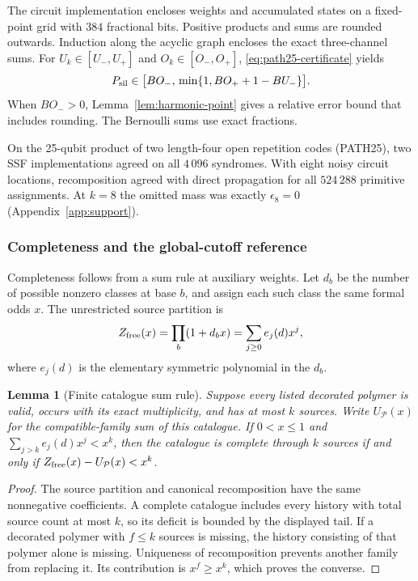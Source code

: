 \documentclass[10pt,twocolumn]{article}
\newtheorem{lemma}[theorem]{Lemma}
\theoremstyle{definition}
\begin{document}
The circuit implementation encloses weights and accumulated states on
a fixed-point grid with $384$ fractional bits. Positive products and
sums are rounded outwards. Induction along the acyclic graph encloses
the exact three-channel sums. For $U_k\in[U_-,U_+]$ and
$O_k\in[O_-,O_+]$, \eqref{eq:path25-certificate} yields
\begin{equation}\label{eq:strip-rounded-interval}
 P_{\rm sil}\in\bigl[BO_-,\,\min\{1,BO_++1-BU_-\}\bigr].
\end{equation}
When $BO_->0$, Lemma~\ref{lem:harmonic-point} gives a relative error
bound that includes rounding. The Bernoulli sums use exact fractions.

On the 25-qubit product of two length-four open repetition codes
(PATH25), two SSF implementations agreed on all $4\,096$ syndromes.
With eight noisy circuit locations, recomposition agreed with direct
propagation for all $524\,288$ primitive assignments. At $k=8$ the
omitted mass was exactly $\epsilon_8=0$ (Appendix~\ref{app:support}).

\subsubsection{Completeness and the global-cutoff reference}
Completeness follows from a sum rule at auxiliary weights.
Let $d_b$ be the number of possible nonzero classes at base $b$, and
assign each such class the same formal odds $x$. The unrestricted
source partition is
\[
 Z_{\rm free}(x)=\prod_b(1+d_bx)
 =\sum_{j\ge0} e_j(d)x^j,
\]
where $e_j(d)$ is the elementary symmetric polynomial in the $d_b$.

\begin{lemma}[Finite catalogue sum rule]\label{lem:strip-completeness}
Suppose every listed decorated polymer is valid, occurs with its exact
multiplicity, and has at most $k$ sources. Write $U_{\mathcal P}(x)$ for
the compatible-family sum of this catalogue. If $0<x\le1$ and
$\sum_{j>k}e_j(d)x^j<x^k$, then the catalogue is complete through $k$
sources if and only if
$Z_{\rm free}(x)-U_{\mathcal P}(x)<x^k$.
\end{lemma}
\begin{proof}
The source partition and canonical recomposition have the same
nonnegative coefficients. A complete catalogue includes every history
with total source count at most $k$, so its deficit is bounded by the
displayed tail. If a decorated polymer with $f\le k$ sources is missing,
the history consisting of that polymer alone is missing. Uniqueness of
recomposition prevents another family from replacing it. Its contribution
is $x^f\ge x^k$, which proves the converse.
\end{proof}
\end{document}
